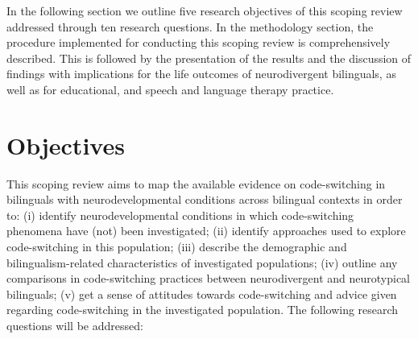 \documentclass[output=paper]{langscibook}
\begin{document}
In the following section we outline five research objectives of this scoping review addressed through ten research questions. In the methodology section, the procedure implemented for conducting this scoping review is comprehensively described. This is followed by the presentation of the results and the discussion of findings with implications for the life outcomes of neurodivergent bilinguals, as well as for educational, and speech and language therapy practice.

\section{Objectives}

This scoping review aims to map the available evidence on code-switching in bilinguals with neurodevelopmental conditions across bilingual contexts in order to: (i) identify neurodevelopmental conditions in which code-switching phenomena have (not) been investigated; (ii) identify approaches used to explore code-switching in this population; (iii) describe the demographic and bilingualism-related characteristics of investigated populations; (iv) outline any comparisons in code-switching practices between neurodivergent and neurotypical bilinguals; (v) get a sense of attitudes towards code-switching and advice given regarding code-switching in the investigated population. The following research questions will be addressed:
\end{document}
